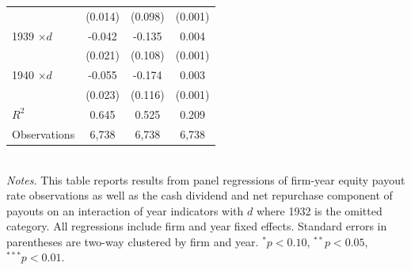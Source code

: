 \begin{table}[p]
\begin{tabular}{lccc}
                & (0.014) & (0.098) & (0.001) \\
1939 $\times d$ & -0.042\sym{*} & -0.135 & 0.004\sym{**} \\
                & (0.021) & (0.108) & (0.001) \\
1940 $\times d$ & -0.055\sym{**} & -0.174 & 0.003\sym{**} \\
                & (0.023) & (0.116) & (0.001) \\
\midrule
$R^2$           & 0.645 & 0.525 & 0.209 \\
Observations    & 6{,}738 & 6{,}738 & 6{,}738 \\
\bottomrule
\end{tabular} \\

\vspace*{3mm} \justifying \noindent
\footnotesize{\textit{Notes.} This table reports results from panel regressions of firm-year equity payout rate observations as well as the cash dividend and net repurchase component of payouts on an interaction of year indicators with $d$ where 1932 is the omitted category. All regressions include firm and year fixed effects. Standard errors in parentheses are two-way clustered by firm and year. $^{*}p<0.10$, $^{**}p<0.05$, $^{***}p<0.01$.}
\end{table}